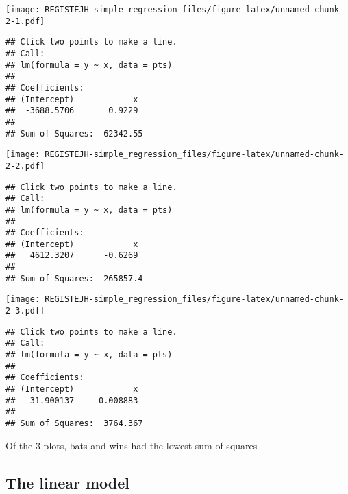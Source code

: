 \documentclass[
]{article}
\newenvironment{Shaded}{\begin{snugshade}}{\end{snugshade}}
\newcommand{\DataTypeTok}[1]{\textcolor[rgb]{0.13,0.29,0.53}{#1}}
\newcommand{\KeywordTok}[1]{\textcolor[rgb]{0.13,0.29,0.53}{\textbf{#1}}}
\newcommand{\NormalTok}[1]{#1}
\newcommand{\OperatorTok}[1]{\textcolor[rgb]{0.81,0.36,0.00}{\textbf{#1}}}
\begin{document}
\texttt{[image: REGISTEJH-simple\_regression\_files/figure-latex/unnamed-chunk-2-1.pdf]}

\begin{verbatim}
## Click two points to make a line.                                
## Call:
## lm(formula = y ~ x, data = pts)
## 
## Coefficients:
## (Intercept)            x  
##  -3688.5706       0.9229  
## 
## Sum of Squares:  62342.55
\end{verbatim}

\begin{Shaded}
\end{Shaded}

\texttt{[image: REGISTEJH-simple\_regression\_files/figure-latex/unnamed-chunk-2-2.pdf]}

\begin{verbatim}
## Click two points to make a line.                                
## Call:
## lm(formula = y ~ x, data = pts)
## 
## Coefficients:
## (Intercept)            x  
##   4612.3207      -0.6269  
## 
## Sum of Squares:  265857.4
\end{verbatim}

\begin{Shaded}
\end{Shaded}

\texttt{[image: REGISTEJH-simple\_regression\_files/figure-latex/unnamed-chunk-2-3.pdf]}

\begin{verbatim}
## Click two points to make a line.                                
## Call:
## lm(formula = y ~ x, data = pts)
## 
## Coefficients:
## (Intercept)            x  
##   31.900137     0.008883  
## 
## Sum of Squares:  3764.367
\end{verbatim}

Of the 3 plots, bats and wins had the lowest sum of squares

\hypertarget{the-linear-model}{%
\subsection{The linear model}\label{the-linear-model}}
\end{document}
